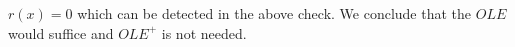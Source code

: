 $r(x)=0$ which can be detected in the above check. We conclude that the $OLE$ would suffice and $OLE^{+}$ is not needed.









